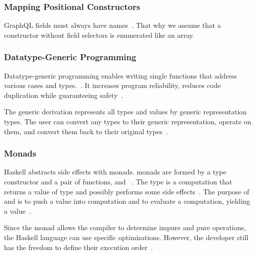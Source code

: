 \begin{frame}[noframenumbering]\frametitle{Mapping Positional Constructors}

GraphQL fields must always have names~\cite{gql-spec}. That why we assume that a constructor without field selectors is enumerated like an array.
  

\end{frame}

\begin{frame}[noframenumbering]\frametitle{Datatype-Generic Programming}
    
  Datatype-generic programming enables writing single functions that address various cases and types.~\cite{derivable-type-classes}. 
  It increases program reliability, reduces code duplication while guaranteeing safety~\cite{datatype-generic-programming,optimizing-generics}.
  
      
  The generic derivation represents all types and values by generic representation types. The user can convert any types to their generic representation, operate on them, and convert them back to their original types~\cite{optimizing-generics, ghc-generics}.
  
  \end{frame}

\begin{frame}[noframenumbering]\frametitle{Monads}

Haskell abstracts side effects with monads. monads are formed by a type constructor  and a pair of functions,  and \expr{>>=}~\cite{history-of-haskell,essence-of-fp}. The type  is a computation that returns a value of type  and possibly performs some side effects~\cite{history-of-haskell}. The purpose of  and \expr{>>=} is to push a value into computation and to evaluate a computation, yielding a value~\cite{essence-of-fp}.

Since the monad allows the compiler to determine impure and pure operations, the Haskell language can use specific optimizations. However, the developer still has the freedom to define their execution order~\cite{history-of-haskell}.

\end{frame}


